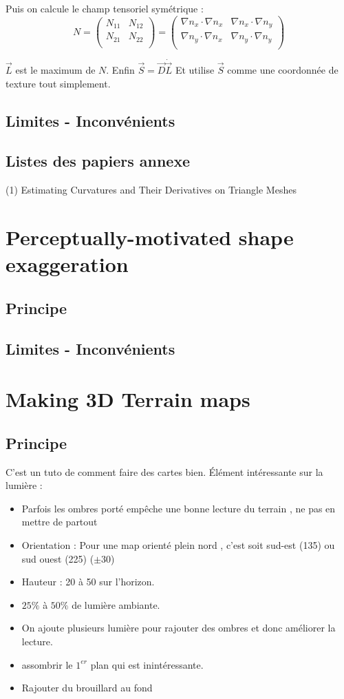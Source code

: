 \documentclass[a4paper]{article}
\begin{document}
Puis on calcule le champ tensoriel symétrique :
\[N = 
\begin{pmatrix}
N_{11} & N_{12} \\
N_{21} & N_{22} \\
\end{pmatrix}= 
\begin{pmatrix}
\nabla n_x \cdot{\nabla n_x} & \nabla n_x \cdot{\nabla n_y}\\
\nabla n_y \cdot{\nabla n_x} & \nabla n_y \cdot{\nabla n_y}\\
\end{pmatrix}\] 

$\vec{L}$ est le maximum de $N$.
Enfin $\vec{S} = \vec{D}\dot{\vec{L}} $
Et utilise $\vec{S}$ comme une coordonnée de texture tout simplement. 
\subsection{Limites - Inconvénients}

\subsection{Listes des papiers annexe}
(1) Estimating Curvatures and Their Derivatives on Triangle Meshes
\section{Perceptually-motivated shape exaggeration}
\subsection{Principe}

\subsection{Limites - Inconvénients}



\section{Making 3D Terrain maps}
\subsection{Principe}
C'est un tuto de comment faire des cartes bien.
Élément intéressante sur la lumière :
\begin{itemize}
\item Parfois les ombres porté empêche une bonne lecture du terrain , ne pas en mettre de partout
\item Orientation : Pour une map orienté plein nord , c'est soit sud-est (135) ou sud ouest (225) ($\pm 30$)
\item Hauteur : 20 à 50 sur l'horizon.
\item $25\%$ à $50 \%$ de lumière ambiante.
\item On ajoute plusieurs lumière pour rajouter des ombres et donc améliorer la lecture.
\item assombrir le $1^{er}$ plan qui est inintéressante. 
\item Rajouter du brouillard au fond 
\end{itemize}
\end{document}
